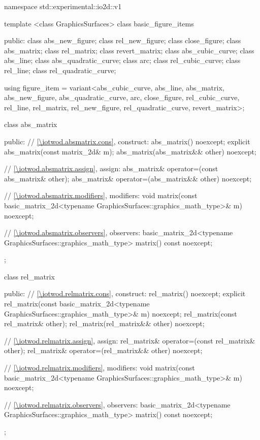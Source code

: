 \begin{codeblock}
namespace std::experimental::io2d::v1 {
  template <class GraphicsSurfaces>
  class basic_figure_items {
  public:
    class abs_new_figure;
    class rel_new_figure;
    class close_figure;
    class abs_matrix;
    class rel_matrix;
    class revert_matrix;
    class abs_cubic_curve;
    class abs_line;
    class abs_quadratic_curve;
    class arc;
    class rel_cubic_curve;
    class rel_line;
    class rel_quadratic_curve;

    using figure_item = variant<abs_cubic_curve, abs_line, abs_matrix,
      abs_new_figure, abs_quadratic_curve, arc, close_figure, rel_cubic_curve, 
      rel_line, rel_matrix, rel_new_figure, rel_quadratic_curve, revert_matrix>;

    class abs_matrix {
	public:
      // \ref{\iotwod.absmatrix.cons}, construct:
      abs_matrix() noexcept;
      explicit abs_matrix(const matrix_2d& m);
      abs_matrix(abs_matrix&& other) noexcept;

      // \ref{\iotwod.absmatrix.assign}, assign:
      abs_matrix& operator=(const abs_matrix& other);
      abs_matrix& operator=(abs_matrix&& other) noexcept;
	
      // \ref{\iotwod.absmatrix.modifiers}, modifiers:
      void matrix(const basic_matrix_2d<typename
        GraphicsSurfaces::graphics_math_type>& m) noexcept;
	
      // \ref{\iotwod.absmatrix.observers}, observers:
      basic_matrix_2d<typename GraphicsSurfaces::graphics_math_type> matrix() const noexcept;
    };

    class rel_matrix {
    public:
      // \ref{\iotwod.relmatrix.cons}, construct:
      rel_matrix() noexcept;
      explicit rel_matrix(const basic_matrix_2d<typename
        GraphicsSurfaces::graphics_math_type>& m) noexcept;
      rel_matrix(const rel_matrix& other);
      rel_matrix(rel_matrix&& other) noexcept;

      // \ref{\iotwod.relmatrix.assign}, assign:
      rel_matrix& operator=(const rel_matrix& other);
      rel_matrix& operator=(rel_matrix&& other) noexcept;

      // \ref{\iotwod.relmatrix.modifiers}, modifiers:
      void matrix(const basic_matrix_2d<typename
        GraphicsSurfaces::graphics_math_type>& m) noexcept;
	
      // \ref{\iotwod.relmatrix.observers}, observers:
      basic_matrix_2d<typename GraphicsSurfaces::graphics_math_type> matrix() const noexcept;
    };

}}
\end{codeblock}
